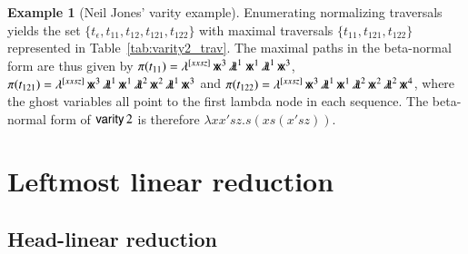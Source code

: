 \documentclass{elsarticle}
\theoremstyle{plain}
\theoremstyle{definition}
\newtheorem{example}{Example}[section]
\newcommand{\ghostlmd}{{\lambda\mkern-7mu \lambda}}
\newcommand{\ghostvar}{\mathsf{x\mkern-5mu x}}
\def\coresymbol{\pi} %
\newcommand{\core}[1]{\coresymbol(#1)} %
\begin{document}
\begin{example}[Neil Jones' varity example]
Enumerating normalizing traversals yields the set $\{t_\epsilon, t_{11}, t_{12}, t_{121}, t_{122} \}$ with maximal traversals $\{ t_{11}, t_{121}, t_{122} \}$ represented in Table~\ref{tab:varity2_trav}.
The maximal paths in the beta-normal form are thus given by
$\core{t_{11}} =
        \lambda^{[x x s z]} \,\ghostvar^{3}\,\ghostlmd^{1}\
        \ghostvar^{1}\,\ghostlmd^{1}\,\ghostvar^{3}
$,
$\core{t_{121}} =
        \lambda^{[x x s z]} \,\ghostvar^{3}\,\ghostlmd^{1}\,\ghostvar^{1}\,\ghostlmd^{2}\,\ghostvar^{2}\,\ghostlmd^{1}\,\ghostvar^{3}$
and
$\core{t_{122}} =
    \lambda^{[x x s z]} \,\ghostvar^{3}\,\ghostlmd^{1}\,\ghostvar^{1}\,\ghostlmd^{2}\,\ghostvar^{2}\,\ghostlmd^{2}\,\ghostvar^{4}$,
where the ghost variables all point to the first lambda node in each sequence.
The beta-normal form of ${\sf varity}\, 2$ is therefore $\lambda x x' s z . s (x s (x' s z))$.
\end{example}


\section{Leftmost linear reduction}
\label{sec:leftmostlinearred}


\subsection{Head-linear reduction}
\end{document}
